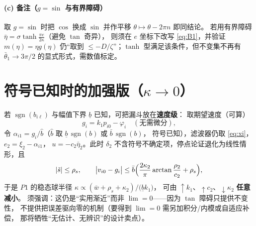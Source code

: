 \documentclass[11pt,a4paper]{article}
\newcommand{\ub}{\underline{b}}
\newcommand{\sgn}{\operatorname{sgn}}
\theoremstyle{plain}
\theoremstyle{definition}
\theoremstyle{remark}
\begin{document}
\paragraph{(c) 备注（$g=\sin$ 与有界障碍）}
取 $g=\sin$ 时把 $\cos$ 换成 $\sin$ 并作平移 $\theta\mapsto\theta-2\pi n$ 即同结论。
若用有界障碍 $\bar\eta=\sigma\tanh\frac{\pi e}{2\kappa}$（避免 $\tan$ 奇异），
则须在 $e$ 坐标下改写 \eqref{eq:B1}，并验证 $m(\eta)=\eta g(\eta)$ 仍“取到
$\le-D/\zeta$”；$\tanh$ 型满足该条件，但不变集不再有
$\bar\theta_1\to3\pi/2$ 的显式形式，需数值标定。

\section{符号已知时的加强版（$\kappa\to0$）}\label{app:known}
若 $\sgn(b_{i\ell})$ 与幅值下界 $\ub$ 已知，可把漏斗放在\textbf{速度级}：
取期望速度（可算）
\begin{equation*}
g_i=k_1p_{i0}-\varphi_i\quad(\text{无需微分}),
\end{equation*}
令 $\alpha_{i1}=g_i/\hat b$（$\hat b$ 取 $\ub\,\sgn(b)$ 或 $\bar b\,\sgn(b)$，
符号已知），滤波器仍取 \eqref{eq:xi}，$e_2=\xi_2-\alpha_{i1}$，
$u=-c_2\bar\eta_2$。此时 $\delta_2$ 不含符号不确定项，停点论证退化为线性情形，且
\begin{equation*}
|\tilde s|\le\rho_s,\qquad
\bigl|v_{i0}-g_i\bigr|\le\bar b\Bigl(\frac{2\kappa_2}{\pi}\arctan\frac{\rho_2}{c_2}+\rho_s\Bigr),
\end{equation*}
于是 $P1$ 的稳态球半径
$\kappa\propto(\bar w+\rho_s+\kappa_2)/\bigl(\ub k_1\bigr)$，
可由 $\uparrow k_1$、$\uparrow c_2$、$\downarrow\kappa_2$ \textbf{任意减小}。
须强调：这仍是“实用渐近”而非 $\lim=0$——因为 $\tan$ 障碍只提供不变性，
不提供把误差驱向零的机制（要得到 $\lim=0$ 需另加积分/内模或自适应补偿，
那将牺牲“无估计、无辨识”的设计卖点）。
\end{document}
